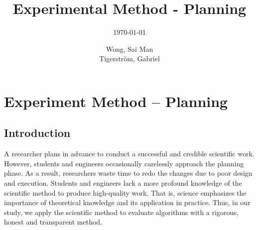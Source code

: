 \documentclass[a4paper,11pt]{kth-mag}
\title{Experimental Method - Planning}
\subtitle{\today}
\author{Wong, Sai Man\\ Tigerstr\"{o}m, Gabriel}
\newcommand*{\skippara}{\par\vspace{\baselineskip} \noindent}
\begin{document}
\frontmatter
\pagestyle{empty}
\removepagenumbers
\maketitle
{}



{
      \hypersetup{linkcolor=black}
      \tableofcontents*
}
\mainmatter
\pagestyle{newchap}



\chapter{Experiment Method -- Planning}
\section{Introduction}\label{sec:intro}

\skippara A researcher plans in advance to conduct a successful and credible scientific work.
However, students and engineers occasionally carelessly approach the planning phase.
As a result, researchers waste time to redo the changes due to poor design and execution.
Students and engineers lack a more profound knowledge of the scientific method to produce high-quality work.
That is, science emphasizes the importance of theoretical knowledge and its application in practice.
Thus, in our study, we apply the scientific method to evaluate algorithms with a rigorous, honest and transparent method.
\end{document}

